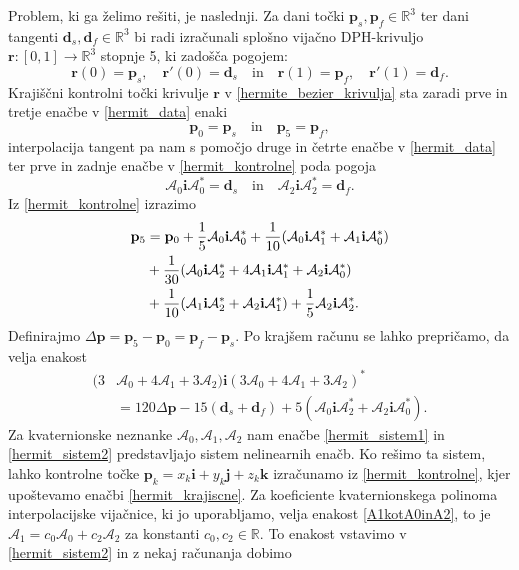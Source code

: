 \documentclass[12pt,a4paper,twoside]{article}
\theoremstyle{definition} %
\theoremstyle{plain} %
\theoremstyle{primerstyle}
\numberwithin{equation}{section}  %
\newcommand{\R}{\mathbb R}
\newcommand{\dV}{\mathbf{d}}
\newcommand{\pV}{\mathbf{p}}
\newcommand{\rV}{\mathbf{r}}
\newcommand{\iV}{\mathbf{i}}
\newcommand{\jV}{\mathbf{j}}
\newcommand{\kV}{\mathbf{k}}
\newcommand{\AQ}{\mathcal{A}}
\begin{document}
Problem, ki ga želimo rešiti, je naslednji. Za dani točki $\pV_s,\pV_f\in \R^3$ ter dani tangenti $\dV_s,\dV_f\in\R^3$ bi radi izračunali splošno vijačno DPH-krivuljo $\rV:[0,1]\rightarrow\R^3$ stopnje 5, ki zadošča pogojem:
\begin{equation}
	\label{hermit_data}
	\rV(0)=\pV_s,\quad\rV'(0)=\dV_s\quad\text{in}\quad\rV(1)=\pV_f,\quad\rV'(1)=\dV_f.
\end{equation}
Krajiščni kontrolni točki krivulje $\rV$ v \eqref{hermite_bezier_krivulja} sta zaradi prve in tretje enačbe v \eqref{hermit_data} enaki
\begin{equation}
	\label{hermit_krajiscne}
	\pV_0=\pV_s\quad\text{in}\quad\pV_5=\pV_f,
\end{equation}
interpolacija tangent pa nam s pomočjo druge in četrte enačbe v \eqref{hermit_data} ter prve in zadnje enačbe v \eqref{hermit_kontrolne} poda pogoja
\begin{equation}
	\label{hermit_sistem1}
	\AQ_0\iV\AQ_0^*=\dV_s\quad\text{in}\quad\AQ_2\iV\AQ_2^*=\dV_f.
\end{equation}
Iz \eqref{hermit_kontrolne} izrazimo
\begin{align}
	\pV_5&=\pV_0+\frac{1}{5}\AQ_0\iV\AQ_0^*+\frac{1}{10}(\AQ_0\iV\AQ_1^*+\AQ_1\iV\AQ_0^*)\notag\\
	&+\frac{1}{30}(\AQ_0\iV\AQ_2^*+4\AQ_1\iV\AQ_1^*+\AQ_2\iV\AQ_0^*)\label{hermit_vsota}\\
	&+\frac{1}{10}(\AQ_1\iV\AQ_2^*+\AQ_2\iV\AQ_1^*)+\frac{1}{5}\AQ_2\iV\AQ_2^*.\notag
\end{align}
Definirajmo $\Delta\pV=\pV_5-\pV_0=\pV_f-\pV_s.$
Po krajšem računu se lahko prepričamo, da velja enakost
\begin{align}
	\label{hermit_sistem2}
	(3&\AQ_0+4\AQ_1+3\AQ_2)\iV(3\AQ_0+4\AQ_1+3\AQ_2)^*\nonumber\\
	&=120\Delta\pV-15(\dV_s+\dV_f)+5(\AQ_0\iV\AQ_2^*+\AQ_2\iV\AQ_0^*).
\end{align}
Za kvaternionske neznanke $\AQ_0,\AQ_1,\AQ_2$ nam enačbe \eqref{hermit_sistem1} in \eqref{hermit_sistem2} predstavljajo sistem nelinearnih enačb. Ko rešimo ta sistem, lahko kontrolne točke $\pV_k=x_k\iV+y_k\jV+z_k\kV$ izračunamo iz \eqref{hermit_kontrolne}, kjer upoštevamo enačbi \eqref{hermit_krajiscne}. Za koeficiente kvaternionskega polinoma interpolacijske vijačnice, ki jo uporabljamo, velja enakost \eqref{A1kotA0inA2}, to je $\AQ_1=c_0\AQ_0+c_2\AQ_2$ za konstanti $c_0,c_2\in\R.$ To enakost vstavimo v \eqref{hermit_sistem2} in z nekaj računanja dobimo
\end{document}
